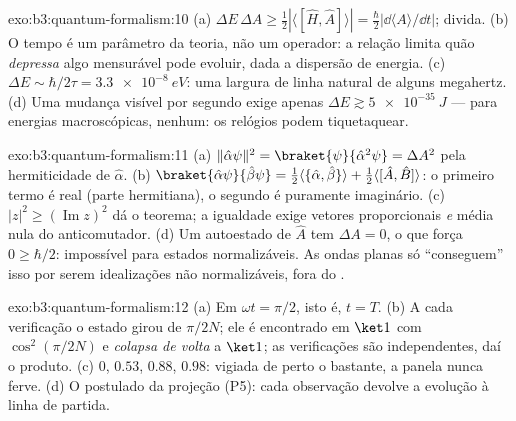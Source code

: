 \begin{solution}{exo:b3:quantum-formalism:10}
(a) $\Delta E\,\Delta A \ge \tfrac12|\langle[\hat H, \hat
A]\rangle| = \tfrac\hbar2|\dd\langle A\rangle/\dd t|$; divida. (b)
O tempo é um parâmetro da teoria, não um operador: a relação limita
quão \emph{depressa} algo mensurável pode evoluir, dada a dispersão de
energia. (c) $\Delta E \sim \hbar/2\tau = \qty{3.3e-8}{eV}$: uma
largura de linha natural de alguns megahertz. (d) Uma mudança visível
por segundo exige apenas $\Delta E \gtrsim \qty{5e-35}{J}$ --- para
energias macroscópicas,  nenhum: os relógios podem tiquetaquear.
\end{solution}

\begin{solution}{exo:b3:quantum-formalism:11}
(a) $\|\hat\alpha\psi\|^2 = \braket{\psi}{\hat\alpha^2\psi} =
\Delta A^2$ pela hermiticidade de $\hat\alpha$. (b) $\braket{\hat\alpha
\psi}{\hat\beta\psi} = \tfrac12\langle\{\hat\alpha,
\hat\beta\}\rangle + \tfrac12\langle[\hat A, \hat B]\rangle$: o
primeiro termo é real (parte hermitiana), o segundo é puramente
imaginário. (c) $|z|^2 \ge (\operatorname{Im}z)^2$ dá o teorema; a
igualdade exige vetores proporcionais \emph{e} média nula do
anticomutador. (d) Um autoestado de $\hat A$ tem $\Delta A = 0$, o que
força $0 \ge \hbar/2$: impossível para estados normalizáveis. As ondas
planas só ``conseguem'' isso por serem idealizações não normalizáveis,
fora do .
\end{solution}

\begin{solution}{exo:b3:quantum-formalism:12}
(a) Em $\omega t = \pi/2$, isto é, $t = T$. (b) A cada verificação o
estado girou de $\pi/2N$; ele é encontrado em $\ket1$ com
$\cos^2(\pi/2N)$ e \emph{colapsa de volta} a $\ket1$; as verificações
são independentes, daí o produto. (c) $0$, $0.53$, $0.88$, $0.98$:
vigiada de perto o bastante, a panela nunca ferve. (d) O postulado da
projeção (P5): cada observação devolve a evolução à linha de partida.
\end{solution}

